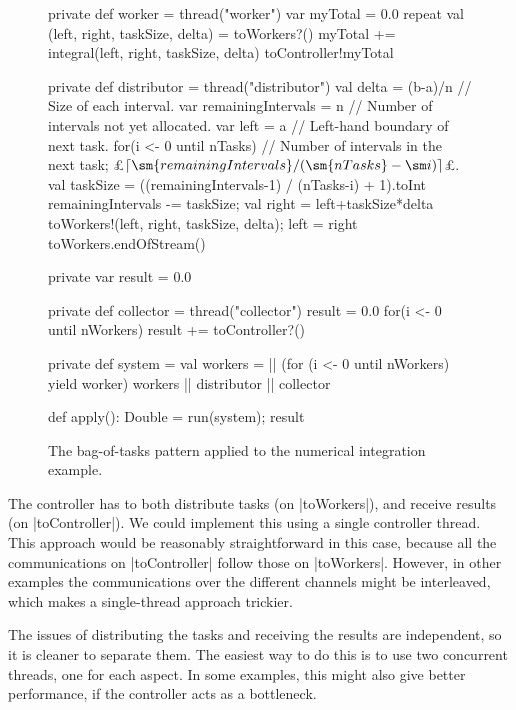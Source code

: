 \begin{figure}
\begin{scala}
  private def worker = thread("worker"){
    var myTotal = 0.0
    repeat{
      val (left, right, taskSize, delta) = toWorkers?()
      myTotal += integral(left, right, taskSize, delta)
    }
    toController!myTotal
  }

  private def distributor = thread("distributor"){
    val delta = (b-a)/n    // Size of each interval.
    var remainingIntervals = n    // Number of intervals not yet allocated.
    var left = a // Left-hand boundary of next task.
    for(i <- 0 until nTasks){
      // Number of intervals in the next task; £$\lceil \sm{remainingIntervals}/(\sm{nTasks}-\sm i)\rceil$£.
      val taskSize = ((remainingIntervals-1) / (nTasks-i) + 1).toInt
      remainingIntervals -= taskSize; val right = left+taskSize*delta
      toWorkers!(left, right, taskSize, delta); left = right
    }
    toWorkers.endOfStream()
  }

  private var result = 0.0

  private def collector = thread("collector"){
    result = 0.0
    for(i <- 0 until nWorkers) result += toController?()
  }

  private def system = {
    val workers = || (for (i <- 0 until nWorkers) yield worker)
    workers || distributor || collector
  }

  def apply(): Double = { run(system); result } 
\end{scala}
\caption{The bag-of-tasks pattern applied to the numerical integration
  example.}
\label{fig:bag-of-tasks}
\end{figure}




The controller has to both distribute tasks (on |toWorkers|), and receive
results (on |toController|).
%
We could implement this using a single controller thread.  This approach would
be reasonably straightforward in this case, because all the communications on
|toController| follow those on |toWorkers|.  However, in other examples the
communications over the different channels might be interleaved, which makes a
single-thread approach trickier.

The issues of distributing the tasks and receiving the results are
independent, so it is cleaner to separate them.  The easiest way to do this is
to use two concurrent threads, one for each aspect.  In some examples, this
might also give better performance, if the controller acts as a bottleneck.

